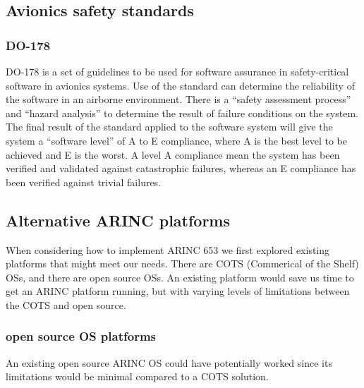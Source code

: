 \subsection{Avionics safety standards}

\subsubsection{DO-178}
DO-178 is a set of guidelines to be used for software assurance in safety-critical software in avionics systems.
Use of the standard can determine the reliability of the software in an airborne environment.
There is a ``safety assessment process'' and ``hazard analysis'' to determine the result of failure conditions on the system.
The final result of the standard applied to the software system will give the system a ``software level'' of A to E compliance,
where A is the best level to be achieved and E is the worst.
A level A compliance mean the system has been verified and validated against catastrophic failures,
whereas an E compliance has been verified against trivial failures.

\subsection{Alternative ARINC platforms}
When considering how to implement ARINC 653 we first explored existing platforms that might meet our needs.
There are COTS (Commerical of the Shelf) OSs, and there are open source OSs.
An existing platform would save us time to get an ARINC platform running,
but with varying levels of limitations between the COTS and open source.

\subsubsection{open source OS platforms}
An existing open source ARINC OS could have potentially worked since its limitations would be minimal
compared to a COTS solution. %

